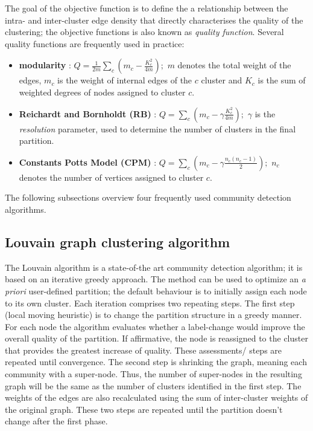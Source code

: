 The goal of the objective function is to define the a relationship between the intra- and inter-cluster edge density that directly characterises the quality of the clustering; the objective functions is also known as \textit{quality function}. Several quality functions are frequently used in practice:
\begin{itemize}
    \item \textbf{modularity} \cite{Newman2004}: $\displaystyle Q = \frac{1}{2m} \sum_c \left(m_c - \frac{K_c^2}{4m}\right);$ $m$ denotes the total weight of the edges, $m_c$ is the weight of internal edges of the $c$ cluster and $K_c$ is the sum of weighted degrees of nodes assigned to cluster $c$.
    
    \item \textbf{Reichardt and Bornholdt (RB)} \cite{Reichardt2006}: $Q = \sum_c \left( m_c - \gamma \frac{K_c^2}{4m}\right);$ $\gamma$ is the \textit{resolution} parameter, used to determine the number of clusters in the final partition.
    \item \textbf{Constants Potts Model (CPM)} \cite{Traag2011}: $Q = \sum_c \left( m_c - \gamma \frac{n_c (n_c - 1)}{2}\right);$  $n_c$ denotes the number of vertices assigned to cluster $c$.
\end{itemize}

The following subsections overview four frequently used community detection algorithms.

\subsection{Louvain graph clustering algorithm}
The Louvain algorithm \cite{Blondel2008b} is a state-of-the art community detection algorithm; it is based on an iterative greedy approach. The method can be used to optimize an \textit{a priori} user-defined partition; the default behaviour is to initially assign each node to its own cluster.
Each iteration comprises two repeating steps. The first step (local moving heuristic) is to change the partition structure in a greedy manner. For each node the algorithm evaluates whether a label-change would improve the overall quality of the partition. If affirmative, the node is reassigned to the cluster that provides the greatest increase of quality. These assessments/ steps are repeated until convergence. The second step is shrinking the graph, meaning each community with a super-node. Thus, the number of super-nodes in the resulting graph will be the same as the number of clusters identified in the first step. The weights of the edges are also recalculated using the sum of inter-cluster weights of the original graph.
These two steps are repeated until the partition doesn't change after the first phase.


